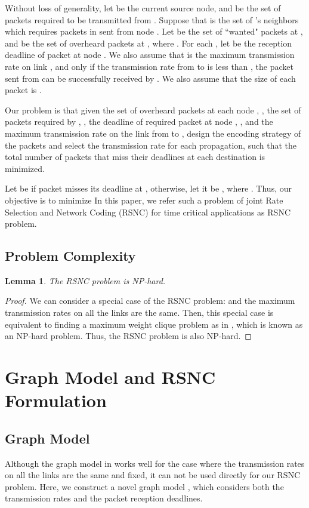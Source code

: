 \documentclass[journal]{IEEEtran}
\newtheorem{lemma}{\textbf{Lemma}}
\begin{document}
Without loss of generality, let  be the current source node, and  be the set of packets required to be transmitted from . Suppose that  is the set of 's neighbors which requires packets in  sent from node . Let  be the set of ``wanted" packets at , and  be the set of overheard packets at , where . For each , let  be the reception deadline of packet  at node . We also assume that  is the maximum transmission rate on link , and only if the transmission rate from  to  is less than , the packet sent from  can be successfully received by  \cite{KV2009Is646}. We also assume that the size of each packet is .

Our problem is that given the set of overheard packets at each node , , the set of packets required by , , the deadline of required packet  at node , , and the maximum transmission rate  on the link from  to , design the encoding strategy of the packets and select the transmission rate for each propagation, such that the total number of packets that miss their deadlines at each destination is minimized.

Let  be  if packet  misses its deadline at , otherwise, let it be , where . Thus, our objective is to minimize
 In this paper, we refer such a problem of joint Rate Selection and Network Coding (RSNC) for time critical applications as RSNC problem.


\vspace{-0.1in}
\subsection{Problem Complexity}
\begin{lemma}
The RSNC problem is NP-hard.
\end{lemma}\vspace{-0.1in}
\begin{proof}
We can consider a special case of the RSNC problem:  and the maximum transmission rates on all the links are the same. Then, this special case is equivalent to finding a maximum weight clique problem as in \cite{ZX2010Broadcast6}, which is known as an NP-hard problem. Thus, the RSNC problem is also NP-hard.
\end{proof}

\vspace{-0.1in}
\section{Graph Model and RSNC Formulation}\label{Sec.solution}
\subsection{Graph Model}\label{graph.model}
Although the graph model in \cite{ZX2010Broadcast6} works well for the case where the transmission rates on all the links are the same and fixed, it can not be used directly for our RSNC problem. Here, we construct a novel graph model , which considers both the transmission rates and the packet reception deadlines.
\end{document}
